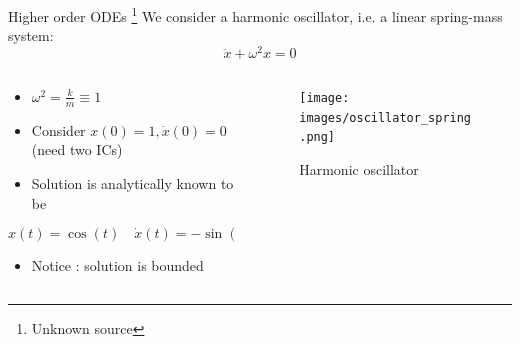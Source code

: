 \documentclass[presentation]{beamer}
\begin{document}
\begin{frame}[label={sec:org1f74b0f}]{Higher order ODEs \footnote{Unknown source}}
We consider a harmonic oscillator, i.e. a linear spring-mass system:
\[ \ddot{x} + \omega^2 x = 0\]
\begin{columns}
\begin{column}{0.6\columnwidth}
\begin{itemize}
\item \(\omega^2 = \frac{k}{m} \equiv 1\)
\item Consider \(x(0) = 1, \dot{x}(0) = 0\) (need two ICs)
\item Solution is analytically known to be
\end{itemize}
\[ x(t) = \cos(t) \quad \dot{x}(t) = -\sin(t) \]
\begin{itemize}
\item Notice : solution is bounded
\end{itemize}
\end{column}
\begin{column}{0.4\columnwidth}
\begin{figure}[htbp]
\centering
\texttt{[image: images/oscillator\_spring.png]}
\caption{Harmonic oscillator}
\end{figure}
\end{column}
\end{columns}
\end{frame}
\end{document}
